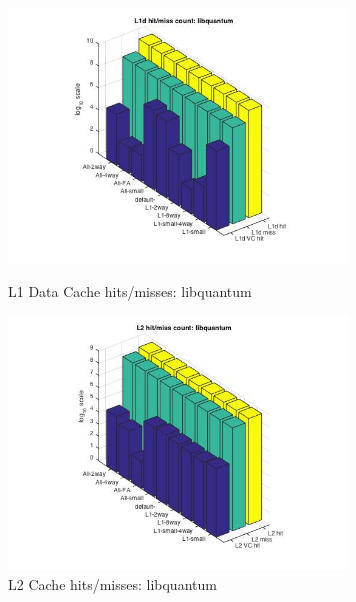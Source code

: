 \documentclass[11pt,titlepage]{article}
\begin{document}
          \begin{figure}[H]
          \centering
          \begin{minipage}{.45\textwidth}
               \includegraphics[width=9cm]{L1DHM_libquantum}
               \caption{L1 Data Cache hits/misses: libquantum}
               \label{fig:L1DHM_libquantum}
          \end{minipage}
          \begin{minipage}{.45\textwidth}
               \includegraphics[width=9cm]{L2HM_libquantum}
               \caption{L2 Cache hits/misses: libquantum}
               \label{fig:L2HM_libquantum}
          \end{minipage}
        \end{figure}
    
\end{document}
